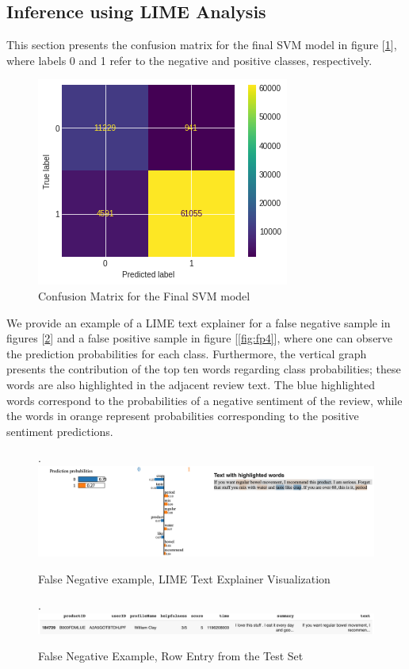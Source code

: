 \documentclass[11pt]{article}
\begin{document}
\subsection{Inference using LIME Analysis}
This section presents the confusion matrix for the final SVM model in figure [\ref{fig:confusion_mat}], where labels 0 and 1 refer to the negative and positive classes, respectively.
\begin{figure}[h!]
    \centering
    \includegraphics[scale=0.55]{figures/LinearSVC_confusion_matrix.png}
    \caption{Confusion Matrix for the Final SVM model}
    \label{fig:confusion_mat}
\end{figure}

We provide an example of a LIME text explainer for a false negative sample in figures [\ref{fig:fn1}] and a false positive sample in figure [\ref{fig:fp4}], where one can observe the prediction probabilities for each class. Furthermore, the vertical graph presents the contribution of the top ten words regarding class probabilities; these words are also highlighted in the adjacent review text. The blue highlighted words correspond to the probabilities of a negative sentiment of the review, while the words in orange represent probabilities corresponding to the positive sentiment predictions.

\begin{figure}.
    \centering
    \includegraphics[scale=0.4]{figures/fn1.png}
    \caption{False Negative example, LIME Text Explainer Visualization}
    \label{fig:fn1}
\end{figure}
\begin{figure}.
    \centering
    \includegraphics[scale=0.4]{figures/fn1_row.png}
    \caption{False Negative Example, Row Entry from the Test Set}
    \label{fig:fn1_row}
\end{figure}
\end{document}
